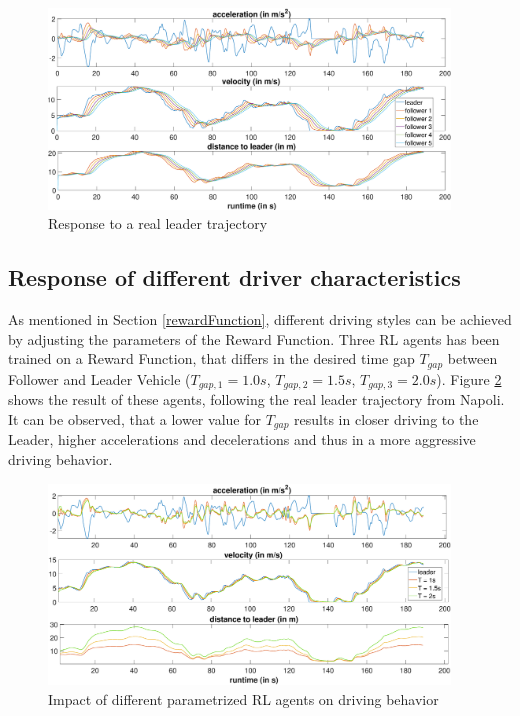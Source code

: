 \documentclass[review]{elsarticle}
\begin{document}
\begin{figure}
	\centering
	\includegraphics[width=0.95\textwidth]{images/PunzoKolonne}
	\caption{Response to a real leader trajectory}
	\label{fig:PunzoKolonne}
\end{figure}


\subsection{Response of different driver characteristics}
\label{sec:differentT}

As mentioned in Section \ref{rewardFunction}, different driving styles can be achieved by adjusting the parameters of the Reward Function. Three RL agents has been trained on a Reward Function, that differs in the desired time gap $T_{gap}$ between Follower and Leader Vehicle ($T_{gap,1} = 1.0s$, $T_{gap,2} = 1.5s$, $T_{gap,3} = 2.0s$). Figure \ref{fig:differentT} shows the result of these agents, following the real leader trajectory from Napoli. It can be observed, that a lower value for $T_{gap}$ results in closer driving to the Leader, higher accelerations and decelerations and thus in a more aggressive driving behavior. 

\begin{figure}
	\centering
	\includegraphics[width=0.95\textwidth]{images/differentT}
	\caption{Impact of different parametrized RL agents on driving behavior}
	\label{fig:differentT}
\end{figure}
\end{document}
